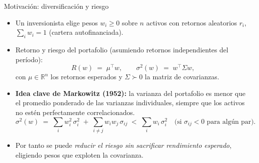 \documentclass[10pt,aspectratio=169]{beamer}
\newcommand{\R}{\mathbb{R}}
\newcommand{\0}{\mathbf{0}}
\newcommand{\1}{\mathbf{1}}
\begin{document}
\begin{frame}{Motivación: diversificación y riesgo}
  \begin{itemize}
    \item Un inversionista elige pesos $w_i\ge0$ sobre $n$ activos con retornos
          aleatorios $r_i$, $\sum_i w_i = 1$ (cartera autofinanciada).
    \item Retorno y riesgo del portafolio (asumiendo retornos independientes
          del período):
          \[
            R(w) \;=\; \mu^{\top}\! w, \qquad
            \sigma^2(w) \;=\; w^{\top}\Sigma w,
          \]
          con $\mu\in\R^n$ los retornos esperados y $\Sigma\succ0$ la matriz de
          covarianzas.
    \item \textbf{Idea clave de Markowitz (1952):} la varianza del
          portafolio es menor que el promedio ponderado de las varianzas
          individuales, siempre que los activos no estén perfectamente
          correlacionados.
          \[
            \sigma^2(w) \;=\; \sum_i w_i^2\,\sigma_i^2
                            \;+\; \sum_{i\ne j} w_i w_j\,\sigma_{ij}
                            \;<\; \sum_i w_i\,\sigma_i^2
                            \quad\text{(si }\sigma_{ij}<0\text{ para algún par)}.
          \]
    \item Por tanto se puede \emph{reducir el riesgo sin sacrificar
          rendimiento esperado}, eligiendo pesos que exploten la covarianza.
  \end{itemize}
\end{frame}
\end{document}
